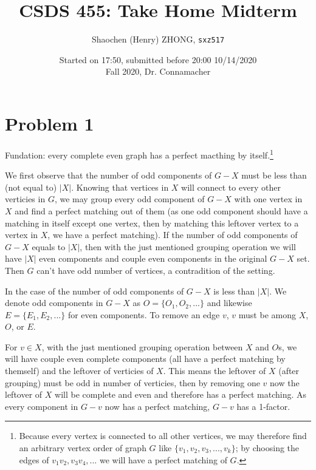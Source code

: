 \documentclass[11pt]{article}
\newcommand{\ilc}{\texttt}
\begin{document}
\title{\textbf{CSDS 455: Take Home Midterm}}

\author{Shaochen (Henry) ZHONG, \ilc{sxz517}}
\date{Started on 17:50, submitted before 20:00 10/14/2020 \\ Fall 2020, Dr. Connamacher}
\maketitle



\section*{Problem 1}

Fundation: every complete even graph has a perfect macthing by itself.\footnote{Because every vertex is connected to all other vertices, we may therefore find an arbitrary vertex order of graph $G$ like $\{v_1, v_2, v_3, ..., v_k \}$; by choosing the edges of $v_1 v_2, v_3 v_4, ...$ we will have a perfect matching of $G$.}\newline

We first observe that the number of odd components of $G-X$ must be less than (not equal to) $|X|$. Knowing that vertices in $X$ will connect to every other verticies in $G$, we may group every odd component of $G-X$ with one vertex in $X$ and find a perfect matching out of them (as one odd component should have a matching in itself except one vertex, then by matching this leftover vertex to a vertex in $X$, we have a perfect matching). If the number of odd components of $G-X$ equals to $|X|$, then with the just mentioned grouping operation we will have $|X|$ even components and couple even components in the original $G-X$ set. Then $G$ can't have odd number of vertices, a contradition of the setting.\newline

In the case of the number of odd components of $G-X$ is less than $|X|$. We denote odd components in $G-X$ as $O = \{O_1, O_2, ... \}$ and likewise $E = \{E_1, E_2, ... \}$ for even components. To remove an edge $v$, $v$ must be among $X$, $O$, or $E$.

For $v \in X$, with the just mentioned grouping operation between $X$ and $O$s, we will have couple even complete components (all have a perfect matching by themself) and the leftover of verticies of $X$. This means the leftover of $X$ (after grouping) must be odd in number of verticies, then by removing one $v$ now the leftover of $X$ will be complete and even and therefore has a perfect matching. As every component in $G-v$ now has a perfect matching, $G-v$ has a 1-factor.
\end{document}
